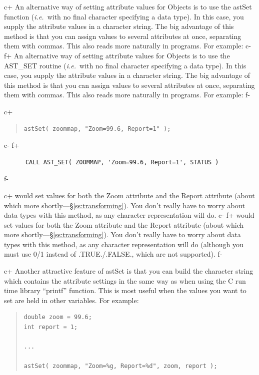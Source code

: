 \documentclass[twoside,11pt]{article}
\newcommand{\secref}[1]{\S\ref{#1}}
\newcommand{\secref}[1]{\ref{#1}}
\begin{document}
c+
An alternative way of setting attribute values for Objects is to use
the astSet function ({\em{i.e.}}\ with no final character specifying a
data type). In this case, you supply the attribute values in a
character string. The big advantage of this method is that you can
assign values to several attributes at once, separating them with
commas. This also reads more naturally in programs. For example:
c-
f+
An alternative way of setting attribute values for Objects is to use
the AST\_SET routine ({\em{i.e.}}\ with no final character specifying
a data type). In this case, you supply the attribute values in a
character string. The big advantage of this method is that you can
assign values to several attributes at once, separating them with
commas. This also reads more naturally in programs. For example:
f-

c+
\begin{quote}
\small
\begin{verbatim}
astSet( zoommap, "Zoom=99.6, Report=1" );
\end{verbatim}
\normalsize
\end{quote}
c-
f+
\small
\begin{verbatim}
      CALL AST_SET( ZOOMMAP, 'Zoom=99.6, Report=1', STATUS )
\end{verbatim}
\normalsize
f-

c+
would set values for both the Zoom attribute and the Report attribute
(about which more shortly---\secref{ss:transforming}). You don't really
have to worry about data types with this method, as any character
representation will do.
c-
f+
would set values for both the Zoom attribute and the Report attribute
(about which more shortly---\secref{ss:transforming}). You don't really
have to worry about data types with this method, as any character
representation will do (although you must use 0/1 instead of
.TRUE./.FALSE., which are not supported).
f-

c+
Another attractive feature of astSet is that you can build the
character string which contains the attribute settings in the same way
as when using the C run time library ``printf'' function. This is most
useful when the values you want to set are held in other
variables. For example:

\begin{quote}
\small
\begin{verbatim}
double zoom = 99.6;
int report = 1;

...

astSet( zoommap, "Zoom=%g, Report=%d", zoom, report );
\end{verbatim}
\normalsize
\end{quote}
\end{document}
